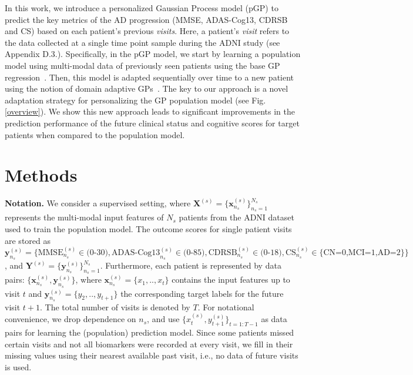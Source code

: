 \documentclass{article}
\newcommand{\vect}[1]{\boldsymbol{#1}}
\begin{document}
In this work, we introduce a personalized Gaussian Process model (pGP) to predict the key metrics of the AD progression (MMSE, ADAS-Cog13, CDRSB and CS) based on each patient's previous \textit{visits}. Here, a patient's \textit{visit} refers to the data collected at a single time point sample during the ADNI study (see Appendix D.3.). Specifically, in the pGP model, we start by learning a population model using multi-modal data of previously seen patients using the base GP regression~\cite{rasmussen2006gaussian}. Then, this model is adapted sequentially over time to a new patient using the notion of domain adaptive GPs~\cite{liu2015bayesian,eleftheriadis2017gaussian}. The key to our approach is a novel adaptation strategy for personalizing the GP population model (see Fig.\ref{overview}). We show this new approach leads to significant improvements in the prediction performance of the future clinical status and cognitive scores for target patients when compared to the population model.  





\section{Methods}
{\bf Notation.} We consider a supervised setting, where $\vect{X}^{(s)} = \{\vect{x}^{(s)}_{n_s}\}_{n_s=1}^{N_s}$ represents the multi-modal input features of $N_s$ patients from the ADNI dataset used to train the population model. The outcome scores for single patient visits are stored as $\vect{y}^{(s)}_{n_s}=\{\text{MMSE}^{(s)}_{n_s}\in\text{(0-30)}, \text{ADAS-Cog13}^{(s)}_{n_s}\in\text{(0-85)}, \text{CDRSB}^{(s)}_{n_s}\in \text{(0-18)},\text{CS}^{(s)}_{n_s}\in\{\text{CN=0,MCI=1,AD=2}\}\}$, and $\vect{Y}^{(s)}=\{\vect{y}^{(s)}_{n_s}\}_{n_s=1}^{N_s}$. Furthermore, each patient is represented by data pairs: $\{ \vect{x}^{(s)}_{n_s},\vect{y}^{(s)}_{n_s}\}$, where $\vect{x}^{(s)}_{n_s}=\{x_1,..,x_{t}\}$ contains the input features up to visit $t$ and $\vect{y}^{(s)}_{n_s}=\{y_2,..,y_{t+1}\}$ the corresponding target labels for the future visit $t+1$. The total number of visits is denoted by $T$. For notational convenience, we drop dependence on $n_s$, and use $\{x_{t}^{(s)},y_{t+1}^{(s)}\}_{t=1:T-1}$ as data pairs for learning the (population) prediction model. Since some patients missed certain visits and not all biomarkers were recorded at every visit, we fill in their missing values using their nearest available past visit, i.e., no data of future visits is used.
 
\end{document}
